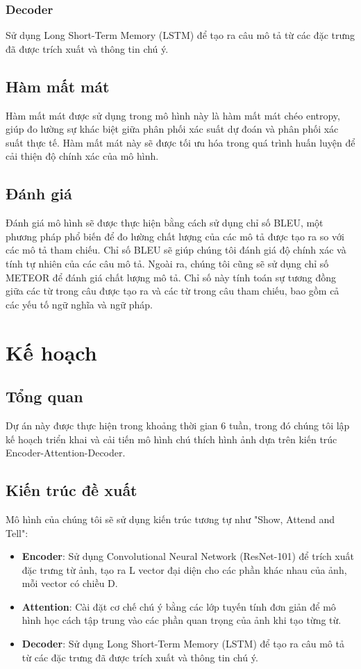 \documentclass[conference]{IEEEtran}
\begin{document}
\subsubsection{Decoder}
Sử dụng Long Short-Term Memory (LSTM) để tạo ra câu mô tả từ các đặc trưng đã được trích xuất và thông tin chú ý.

\subsection{Hàm mất mát}
Hàm mất mát được sử dụng trong mô hình này là hàm mất mát chéo entropy, giúp đo lường sự khác biệt giữa phân phối xác suất dự đoán và phân phối xác suất thực tế. Hàm mất mát này sẽ được tối ưu hóa trong quá trình huấn luyện để cải thiện độ chính xác của mô hình.

\subsection{Đánh giá}

Đánh giá mô hình sẽ được thực hiện bằng cách sử dụng chỉ số BLEU, một phương pháp phổ biến để đo lường chất lượng của các mô tả được tạo ra so với các mô tả tham chiếu. Chỉ số BLEU sẽ giúp chúng tôi đánh giá độ chính xác và tính tự nhiên của các câu mô tả.
Ngoài ra, chúng tôi cũng sẽ sử dụng chỉ số METEOR để đánh giá chất lượng mô tả. Chỉ số này tính toán sự tương đồng giữa các từ trong câu được tạo ra và các từ trong câu tham chiếu, bao gồm cả các yếu tố ngữ nghĩa và ngữ pháp.

\section{Kế hoạch}
\subsection{Tổng quan}
Dự án này được thực hiện trong khoảng thời gian 6 tuần, trong đó chúng tôi lập kế hoạch triển khai và cải tiến mô hình chú thích hình ảnh dựa trên kiến trúc Encoder-Attention-Decoder.
\subsection{Kiến trúc đề xuất}
Mô hình của chúng tôi sẽ sử dụng kiến trúc tương tự như "Show, Attend and Tell":
\begin{itemize}
    \item \textbf{Encoder}: Sử dụng Convolutional Neural Network (ResNet-101) để trích xuất đặc trưng từ ảnh, tạo ra L vector đại diện cho các phần khác nhau của ảnh, mỗi vector có chiều D.
    \item \textbf{Attention}: Cài đặt cơ chế chú ý bằng các lớp tuyến tính đơn giản để mô hình học cách tập trung vào các phần quan trọng của ảnh khi tạo từng từ.
    \item \textbf{Decoder}: Sử dụng Long Short-Term Memory (LSTM) để tạo ra câu mô tả từ các đặc trưng đã được trích xuất và thông tin chú ý.
\end{itemize}
\end{document}
